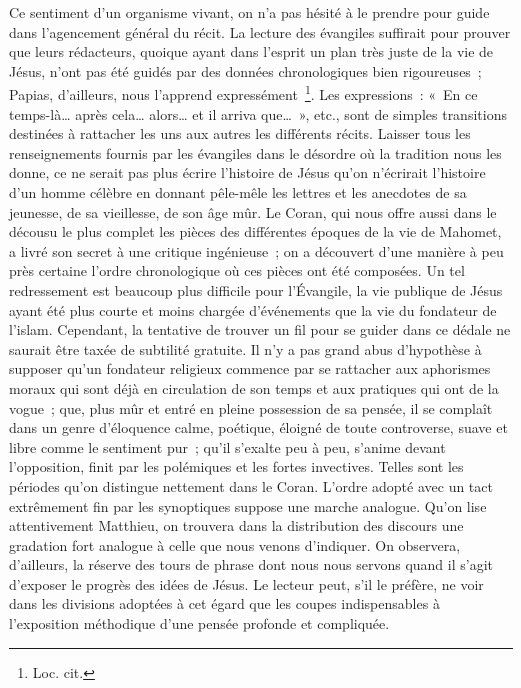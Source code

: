 \documentclass[french,twoside]{book} %
\begin{document}
Ce sentiment d’un organisme vivant, on n’a pas hésité à le prendre pour guide dans l’agencement général du récit. La lecture des évangiles suffirait pour prouver que leurs rédacteurs, quoique ayant dans l’esprit un plan très juste de la vie de Jésus, n’ont pas été guidés par des données chronologiques bien rigoureuses ; Papias, d’ailleurs, nous l’apprend expressément \footnote{Loc. cit.}. Les expressions : « En ce temps-là… après cela… alors… et il arriva que… », etc., sont de simples transitions destinées à rattacher les uns aux autres les différents récits. Laisser tous les renseignements fournis par les évangiles dans le désordre où la tradition nous les donne, ce ne serait pas plus écrire l’histoire de Jésus qu’on n’écrirait l’histoire d’un homme célèbre en donnant pêle-mêle les lettres et les anecdotes de sa jeunesse, de sa vieillesse, de son âge mûr. Le Coran, qui nous offre aussi dans le décousu le plus complet les pièces des différentes époques de la vie de Mahomet, a livré son secret à une critique ingénieuse ; on a découvert d’une manière à peu près certaine l’ordre chronologique où ces pièces ont été composées. Un tel redressement est beaucoup plus difficile pour l’Évangile, la vie publique de Jésus ayant été plus courte et moins chargée d’événements que la vie du fondateur de l’islam. Cependant, la tentative de trouver un fil pour se guider dans ce dédale ne saurait être taxée de subtilité gratuite. Il n’y a pas grand abus d’hypothèse à supposer qu’un fondateur religieux commence par se rattacher aux aphorismes moraux qui sont déjà en circulation de son temps et aux pratiques qui ont de la vogue ; que, plus mûr et entré en pleine possession de sa pensée, il se complaît dans un genre d’éloquence calme, poétique, éloigné de toute controverse, suave et libre comme le sentiment pur ; qu’il s’exalte peu à peu, s’anime devant l’opposition, finit par les polémiques et les fortes invectives. Telles sont les périodes qu’on distingue nettement dans le Coran. L’ordre adopté avec un tact extrêmement fin par les synoptiques suppose une marche analogue. Qu’on lise attentivement Matthieu, on trouvera dans la distribution des discours une gradation fort analogue à celle que nous venons d’indiquer. On observera, d’ailleurs, la réserve des tours de phrase dont nous nous servons quand il s’agit d’exposer le progrès des idées de Jésus. Le lecteur peut, s’il le préfère, ne voir dans les divisions adoptées à cet égard que les coupes indispensables à l’exposition méthodique d’une pensée profonde et compliquée.\par
\end{document}
